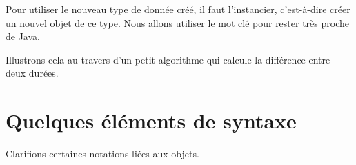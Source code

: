 		Pour utiliser le nouveau type de donnée créé,
		il faut l'instancier, c'est-à-dire créer un nouvel objet de ce type.
		Nous allons utiliser le mot clé \lda{\New} pour rester très proche de Java.
		
		Illustrons cela au travers d'un petit algorithme
		qui calcule la différence entre deux durées.
		
		\begin{algo}
		\end{algo}

\section{Quelques éléments de syntaxe}

	Clarifions certaines notations liées aux objets.

